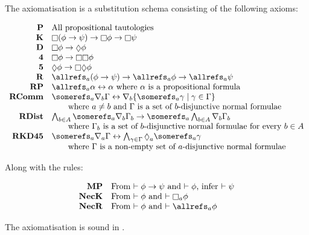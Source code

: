 \begin{definition}[\axiomKDF]
The axiomatisation \axiomKDF{} is a substitution schema consisting of the
following axioms:

$$
\begin{array}{rl}
{\bf P} & \text{All propositional tautologies}\\
{\bf K} & \knows (\phi \implies \psi) \implies \knows \phi \implies \knows
\psi\\
{\bf D} & \knows \phi \implies \suspects \phi\\
{\bf 4} & \knows \phi \implies \knows \knows \phi\\
{\bf 5} & \suspects \phi \implies \knows \suspects \phi\\
{\bf R} & \allrefs_a (\phi \implies \psi) \implies \allrefs_a \phi \implies
\allrefs_a \psi\\
{\bf RP} & \allrefs_a \alpha \iff \alpha \text{ where $\alpha$ is a
propositional formula}\\
{\bf RComm} & \somerefs_a \covers_b \Gamma \iff \covers_b \{\somerefs_a \gamma
\mid \gamma \in \Gamma\}\\ 
&\qquad\text{where $a \neq b$ and $\Gamma$ is a set of $b$-disjunctive normal formulae}\\
{\bf RDist} & \bigwedge_{b \in A} \somerefs_a \covers_b \Gamma_b \implies
\somerefs_a \bigwedge_{b \in A} \covers_b \Gamma_b\\
&\qquad\text{where $\Gamma_b$ is a set of $b$-disjunctive normal formulae for every $b \in A$}\\
{\bf RKD45} & \somerefs_a \covers_a \Gamma \iff \bigwedge_{\gamma \in \Gamma}
\suspects_a \somerefs_a \gamma\\
&\qquad\text{where $\Gamma$ is a non-empty set of $a$-disjunctive
normal formulae}\\
\end{array}
$$

Along with the rules:

$$
\begin{array}{rl}
{\bf MP} & \text{From $\proves \phi \implies \psi$ and $\proves \phi$, infer
$\proves \psi$}\\
{\bf NecK} & \text{From $\proves \phi$ and $\proves \knows_a \phi$}\\
{\bf NecR} & \text{From $\proves \phi$ and $\proves \allrefs_a \phi$}
\end{array}
$$
\end{definition}

\begin{lemma}\label{kd45-sound}
The axiomatisation \axiomKDF{} is sound in \logicKDF{}.
\end{lemma}

